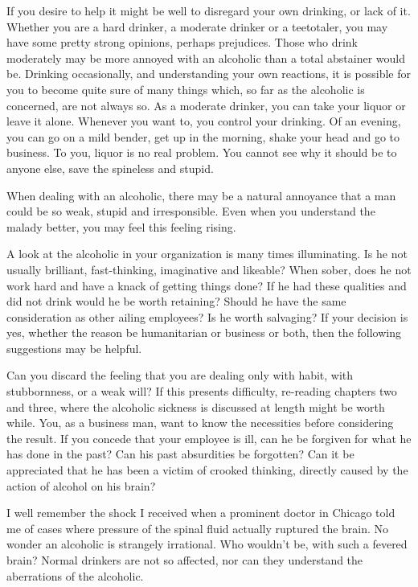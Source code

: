 \begin{biblechapter}
If you desire to help it might be well to disregard your own drinking, or lack of it.  Whether you are a hard drinker, a moderate drinker or a teetotaler, you may have some pretty strong opinions, perhaps prejudices.  Those who drink moderately may be more annoyed with an alcoholic than a total abstainer would be.  Drinking occasionally, and understanding your own reactions, it is possible for you to become quite sure of many things which, so far as the alcoholic is concerned, are not always so.  As a moderate drinker, you can take your liquor or leave it alone.  Whenever you want to, you control your drinking.  Of an evening, you can go on a mild bender, get up in the morning, shake your head and go to business.  To you, liquor is no real problem.  You cannot see why it should be to anyone else, save the spineless and stupid.

When dealing with an alcoholic, there may be a natural annoyance that a man could be so weak, stupid and irresponsible.  Even when you understand the malady better, you may feel this feeling rising.

A look at the alcoholic in your organization is many times illuminating.  Is he not usually brilliant, fast-thinking, imaginative and likeable?  When sober, does he not work hard and have a knack of getting things done?  If he had these qualities and did not drink would he be worth retaining?  Should he have the same consideration as other ailing employees?  Is he worth salvaging?  If your decision is yes, whether the reason be humanitarian or business or both, then the following suggestions may be helpful.

Can you discard the feeling that you are dealing only with habit, with stubbornness, or a weak will?  If this presents difficulty, re-reading chapters two and three, where the alcoholic sickness is discussed at length might be worth while. You, as a business man, want to know the necessities before considering the result.  If you concede that your employee is ill, can he be forgiven for what he has done in the past?  Can his past absurdities be forgotten?  Can it be appreciated that he has been a victim of crooked thinking, directly caused by the action of alcohol on his brain?

I well remember the shock I received when a prominent doctor in Chicago told me of cases where pressure of the spinal fluid actually ruptured the brain.  No wonder an alcoholic is strangely irrational.  Who wouldn't be, with such a fevered brain?  Normal drinkers are not so affected, nor can they understand the aberrations of the alcoholic.


\end{biblechapter}
